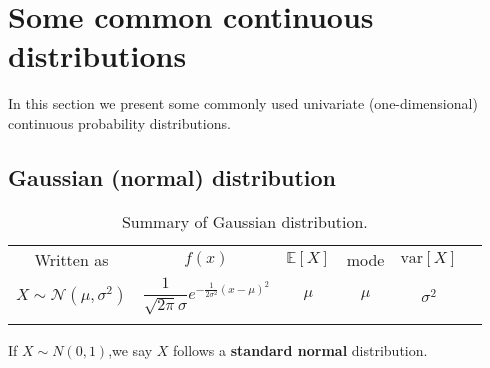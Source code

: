 \section{Some common continuous distributions}
In this section we present some commonly used univariate (one-dimensional) continuous probability distributions.


\subsection{Gaussian (normal) distribution}


\begin{table}
\caption{Summary of Gaussian distribution.}
\centering
\begin{tabular}{cccccc}
\hline\noalign{\smallskip}
Written as & $f(x)$ & $\mathbb{E}[X]$ & mode & $\text{var}[X]$ \\
\noalign{\smallskip}\svhline\noalign{\smallskip}
$X \sim \mathcal{N}(\mu,\sigma^2)$ & $\dfrac{1}{\sqrt{2\pi}\sigma}e^{-\frac{1}{2\sigma^2}\left(x-\mu\right)^2}$ & $\mu$ & $\mu$ & $\sigma^2$ \\
\noalign{\smallskip}\hline
\end{tabular}
\end{table} 

If $X \sim N(0,1)$,we say $X$ follows a \textbf{standard normal} distribution.

